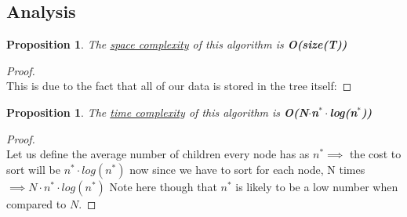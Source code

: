 \documentclass[12pt]{article}
\newtheorem{proposition}[theorem]{Proposition}
\begin{document}
\subsection{Analysis}

\begin{proposition}
\label{numq}
The \underline{space complexity} of this algorithm is \textbf{O(size(T))}
\end{proposition}

\begin{proof}
~ \\ \indent This is due to the fact that all of our data is stored in the tree itself:
\end{proof}

\begin{proposition}
\label{numq}
The \underline{time complexity} of this algorithm is \textbf{O(N$\cdot$n$^{\ast}\cdot$log(n$^{\ast}$))}
\end{proposition}

\begin{proof}
~ \\ \indent Let us define the average number of children every node has as $n^{\ast} \implies$ the
cost to sort will be $n^{\ast}\cdot log(n^{\ast})$ now since we have to sort for each node, N times
$\implies N\cdot n^{\ast}\cdot log(n^{\ast})$ Note here though that $n^{\ast}$ is likely to be a low
number when compared to $N$.
\end{proof}




\end{document}
